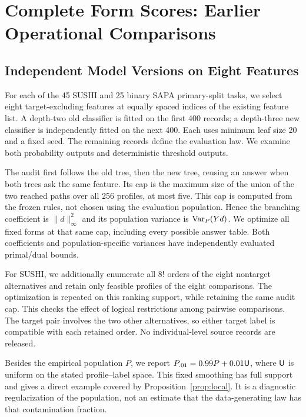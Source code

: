\section{Complete Form Scores: Earlier Operational Comparisons}\label{legacy:operational}
\subsection{Independent Model Versions on Eight Features}\label{app:medium}
For each of the 45 SUSHI and 25 binary SAPA primary-split tasks, we select
eight target-excluding features at equally spaced indices of the existing
feature list. A depth-two old classifier is fitted on the first 400 records;
a depth-three new classifier is independently fitted on the next 400.
Each uses minimum leaf size 20 and a fixed seed. The remaining records
define the evaluation law. We examine both probability outputs and
deterministic threshold outputs.

The audit first follows the old tree, then the new tree, reusing an answer
when both trees ask the same feature. Its cap is the maximum size of the
union of the two reached paths over all 256 profiles, at most five. This
cap is computed from the frozen rules, not chosen using the evaluation
population. Hence the branching coefficient is $\|d\|_\infty^2$ and its
population variance is $\operatorname{Var}_P(Yd)$. We optimize all fixed forms at that
same cap, including every possible answer table. Both coefficients and
population-specific variances have independently evaluated primal/dual
bounds.

For SUSHI, we additionally enumerate all $8!$ orders of the eight nontarget
alternatives and retain only feasible profiles of the eight comparisons.
The optimization is repeated on this ranking support, while retaining the
same audit cap. This checks the effect of logical restrictions among
pairwise comparisons. The target pair involves the two other alternatives,
so either target label is compatible with each retained order. No
individual-level source records are released.

Besides the empirical population $P$, we report
$P_{.01}=0.99P+0.01\mathsf U$, where $\mathsf U$ is uniform on the stated profile--label
space. This fixed smoothing has full support and gives a direct
example covered by Proposition~\ref{prop:local}. It is a diagnostic
regularization of the population, not an estimate that the data-generating
law has that contamination fraction.




